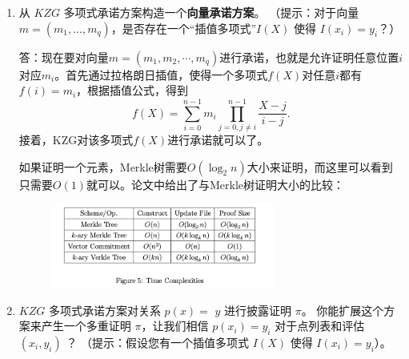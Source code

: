 \documentclass[10pt]{ctexart}
\begin{document}
\begin{enumerate}
    \item 从 $KZG$ 多项式承诺方案构造一个\textbf{向量承诺方案}。 （提示：对于向量 $m=\left(m_{1}, \ldots, m_{q}\right)$，是否存在一个“插值多项式”$I(X)$ 使得 $I\left(x_{i}\right)=y_{i}$？）
    \begin{center}
    \end{center}
    答：现在要对向量$m = (m_1,m_2,\cdots,m_q)$进行承诺，也就是允许证明任意位置$i$对应$m_i$。首先通过拉格朗日插值，使得一个多项式$f(X)$对任意$i$都有$f(i)=m_i$，根据插值公式，得到
    $$
    f(X) = \sum_{i=0}^{n-1}m_i \prod_{j=0, j\neq i}^{n-1}\frac{X-j}{i-j}.
    $$
    接着，KZG对该多项式$f(X)$进行承诺就可以了。

    如果证明一个元素，Merkle树需要$O(\log_2n)$大小来证明，而这里可以看到只需要$O(1)$就可以。论文\cite{VerkleTree}中给出了与Merkle树证明大小的比较：
    \begin{figure}[H]
        \centering
        \includegraphics[width=0.7\textwidth]{img/VerkleTree.png} 
    \end{figure}

    \item $KZG$ 多项式承诺方案对关系 $p(x)=$ $y$ 进行披露证明 $\pi$。 你能扩展这个方案来产生一个多重证明 $\pi$，让我们相信 $p\left(x_{i}\right)=y_{i}$ 对于点列表和评估 $\left(x_{i }, y_{i}\right)$ ？ （提示：假设您有一个插值多项式 $I(X)$ 使得 $I\left(x_{i}\right)=y_{i}$）。


\end{enumerate}
\end{document}
